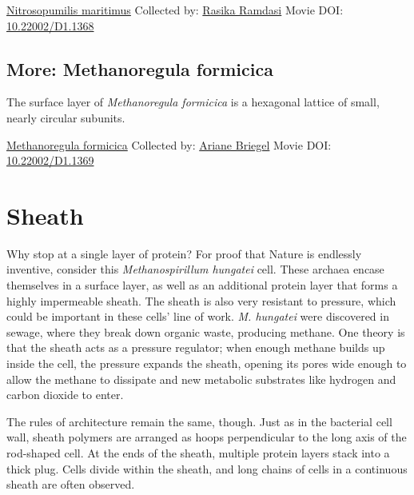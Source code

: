 \documentclass[]{tufte-book}
\begin{document}
\hypertarget{htmlwidget-7cfe74e2cd4e288c84c8}{}

\label{fig:2-7c}\protect\hyperlink{tree}{Nitrosopumilis maritimus} Collected by: \protect\hyperlink{rasika_ramdasi}{Rasika Ramdasi} Movie DOI: \href{https://doi.org/10.22002/D1.1368}{10.22002/D1.1368}

\hypertarget{Methanoregula_formicica}{%
\subsection*{More: Methanoregula formicica}\label{Methanoregula_formicica}}

The surface layer of \emph{Methanoregula formicica} is a hexagonal lattice of small, nearly circular subunits.



\hypertarget{htmlwidget-1d942757895dbad87e01}{}

\label{fig:2-7d}\protect\hyperlink{tree}{Methanoregula formicica} Collected by: \protect\hyperlink{ariane_briegel}{Ariane Briegel} Movie DOI: \href{https://doi.org/10.22002/D1.1369}{10.22002/D1.1369}

\hypertarget{sheath}{%
\section{Sheath}\label{sheath}}

Why stop at a single layer of protein? For proof that Nature is endlessly inventive, consider this \emph{Methanospirillum hungatei} cell. These archaea encase themselves in a surface layer, as well as an additional protein layer that forms a highly impermeable sheath. The sheath is also very resistant to pressure, which could be important in these cells' line of work. \emph{M. hungatei} were discovered in sewage, where they break down organic waste, producing methane. One theory is that the sheath acts as a pressure regulator; when enough methane builds up inside the cell, the pressure expands the sheath, opening its pores wide enough to allow the methane to dissipate and new metabolic substrates like hydrogen and carbon dioxide to enter.

The rules of architecture remain the same, though. Just as in the bacterial cell wall, sheath polymers are arranged as hoops perpendicular to the long axis of the rod-shaped cell. At the ends of the sheath, multiple protein layers stack into a thick plug. Cells divide within the sheath, and long chains of cells in a continuous sheath are often observed.
\end{document}
